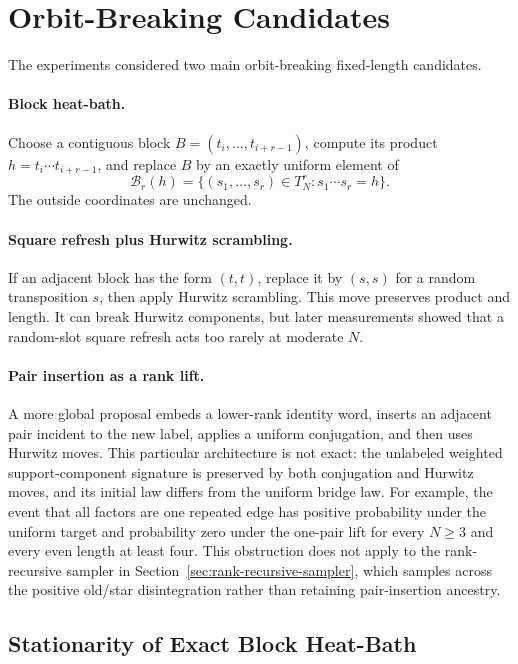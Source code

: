 \section{Orbit-Breaking Candidates}

The experiments considered two main orbit-breaking fixed-length candidates.

\paragraph{Block heat-bath.}
Choose a contiguous block $B=(t_i,\ldots,t_{i+r-1})$, compute its product
$h=t_i\cdots t_{i+r-1}$, and replace $B$ by an exactly uniform element of
\[
  \mathcal{B}_r(h)
  =
  \{(s_1,\ldots,s_r)\in T_N^r : s_1\cdots s_r=h\}.
\]
The outside coordinates are unchanged.

\paragraph{Square refresh plus Hurwitz scrambling.}
If an adjacent block has the form $(t,t)$, replace it by $(s,s)$ for a random
transposition $s$, then apply Hurwitz scrambling.  This move preserves product
and length.  It can break Hurwitz components, but later measurements showed
that a random-slot square refresh acts too rarely at moderate $N$.

\paragraph{Pair insertion as a rank lift.}
A more global proposal embeds a lower-rank identity word, inserts an adjacent
pair incident to the new label, applies a uniform conjugation, and then uses
Hurwitz moves.  This particular architecture is not exact: the unlabeled
weighted support-component signature is preserved by both conjugation and
Hurwitz moves, and its initial law differs from the uniform bridge law.  For
example, the event that all factors are one repeated edge has positive
probability under the uniform target and probability zero under the one-pair
lift for every $N\ge3$ and every even length at least four.  This obstruction
does not apply to the rank-recursive sampler in
Section~\ref{sec:rank-recursive-sampler}, which samples across the positive
old/star disintegration rather than retaining pair-insertion ancestry.

\subsection{Stationarity of Exact Block Heat-Bath}

